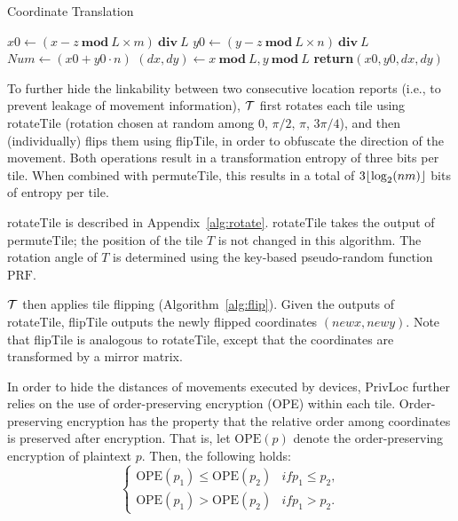 \documentclass{llncs}
\DeclarePairedDelimiter{\floor}{\lfloor}{\rfloor}
\newcommand\sol{{\sf PrivLoc}}
\newcommand\LENGTH{\mathit{L}}
\newcommand\COLUMNS{\mathit{m}}
\newcommand\ROWS{\mathit{n}}
\newcommand\newx{\mathit{newx}}
\newcommand\newy{\mathit{newy}}
\begin{document}
\begin{algorithm}[t]
\caption{Coordinate Translation}
\label{alg:divide}	
\begin{algorithmic}[1]
\State $x0 \gets (x - z~\mathbf{mod}~\LENGTH \times \COLUMNS)~\mathbf{div}~\LENGTH$
\State $y0 \gets (y - z~\mathbf{mod}~\LENGTH \times \ROWS)~\mathbf{div}~\LENGTH$
\State $\mathit{Num}\gets (x0 + y0 \cdot \ROWS)$
\State $(dx, dy) \gets x~\mathbf{mod}~\LENGTH, y~\mathbf{mod}~\LENGTH$
\State \textbf{return}$(x0,y0,dx,dy)$
\EndProcedure
\end{algorithmic}
\end{algorithm}

To further hide the linkability between two consecutive location reports (i.e., to prevent leakage of movement information), $\cal T$ first rotates each tile using {\sf rotateTile} (rotation
chosen at random among 0, $\pi/2$, $\pi$, $3\pi/4$), and then (individually) flips them using {\sf flipTile}, in order to obfuscate the
direction of the movement. Both operations result in a transformation entropy of three bits per tile. When combined with {\sf permuteTile}, this results in a total of $3\floor{\log_2(nm)}$ bits of entropy per tile.

{\sf rotateTile} is described in Appendix~\ref{alg:rotate}. {\sf rotateTile} takes the output of {\sf permuteTile}; the position of the tile $T$ is not changed in this algorithm. The
rotation angle of $T$ is determined using the key-based pseudo-random function $\text{PRF}$.


$\cal T$ then applies tile flipping (Algorithm~\ref{alg:flip}). Given the outputs of {\sf rotateTile}, {\sf flipTile} outputs the newly flipped coordinates $(\newx, \newy)$.
Note that {\sf flipTile} is analogous to {\sf rotateTile}, except that the coordinates are transformed by a mirror matrix.


In order to hide the distances of movements executed by devices, \sol{} further relies on the use of order-preserving encryption (OPE) within each tile.
Order-preserving encryption has the property that the relative order among coordinates is preserved after encryption. That is, let $\mathrm{OPE}(p)$ denote the order-preserving encryption of plaintext $p$.
Then, the following holds:
\vspace{-1 em}
\begin{equation*}
\left\{
\begin{array}{rl}
  \mathrm{OPE}(p_1) \leq \mathrm{OPE}(p_2) & if p_1 \leq p_2, \\
\mathrm{OPE}(p_1) > \mathrm{OPE}(p_2) & if p_1 > p_2.
\end{array}
\right.
\end{equation*}
\end{document}
